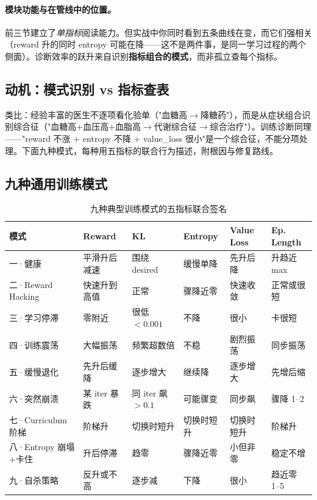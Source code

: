 \paragraph{模块功能与在管线中的位置。}前三节建立了\emph{单指标}阅读能力。但实战中你同时看到五条曲线在变，而它们强相关（reward 升的同时 entropy 可能在降——这不是两件事，是同一学习过程的两个侧面）。诊断效率的跃升来自识别\textbf{指标组合的模式}，而非孤立查每个指标。

\subsection{动机：模式识别 vs 指标查表}

类比：经验丰富的医生不逐项看化验单（"血糖高$\to$降糖药"），而是从症状组合识别综合征（"血糖高$+$血压高$+$血脂高$\to$代谢综合征$\to$综合治疗"）。训练诊断同理——"reward 不涨 $+$ entropy 不降 $+$ value\_loss 很小"是一个综合征，不能分项处理。下面九种模式，每种用五指标的联合行为描述，附根因与修复路线。

\subsection{九种通用训练模式}

\begin{table}[H]
\centering
\caption{九种典型训练模式的五指标联合签名}
\label{tab:rlmc-diag-9modes}
\begin{tabular}{p{2.7cm}p{1.9cm}p{1.9cm}p{1.9cm}p{1.7cm}p{1.9cm}}
\hline
模式 & Reward & KL & Entropy & Value Loss & Ep.\,Length \\
\hline
一·健康 & 平滑升后减速 & 围绕 desired & 缓慢单降 & 先升后降 & 升趋近 max \\
二·Reward Hacking & 快速升到高值 & 正常 & 骤降近零 & 快速收敛 & 正常或很短 \\
三·学习停滞 & 零附近 & 很低 $<0.001$ & 不降 & 很小 & 卡很短 \\
四·训练震荡 & 大幅振荡 & 频繁超数倍 & 不稳 & 剧烈振荡 & 同步振荡 \\
五·缓慢退化 & 先升后缓降 & 逐步增大 & 继续降 & 逐步增大 & 先增后缩 \\
六·突然崩溃 & 某 iter 暴跌 & 同 iter 飙 $>0.1$ & 可能骤变 & 同步飙 & 骤降 1--2 \\
七·Curriculum 阶梯 & 阶梯升 & 切换时短升 & 切换时短升 & 切换时短升 & 阶梯升 \\
八·Entropy 崩塌+卡住 & 升后停滞 & 趋零 & 骤降近零 & 小但非零 & 稳定不增 \\
九·自杀策略 & 反升或不高 & 逐步减 & 下降 & 很小 & 趋近零 1--5 \\
\hline
\end{tabular}
\end{table}

